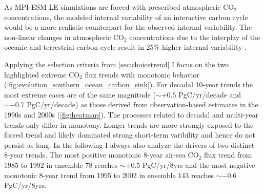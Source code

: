 As \acs{MPI-ESM LE} simulations are forced with prescribed atmospheric CO$_2$ concentrations, the modeled internal variability of an interactive carbon cycle would be a more realistic counterpart for the observed internal variability. The non-linear changes in atmospheric CO$_2$ concentrations due to the interplay of the oceanic and terrestrial carbon cycle result in 25\% higher internal variability \citep{Ilyina2013}.\newline





Applying the selection criteria from \autoref{sec:choicetrend} I focus on the two highlighted extreme CO$_2$ flux trends with monotonic behavior (\autoref{fig:evolution_southern_ocean_carbon_sink}). For decadal 10-year trends the most extreme cases are of the same magnitude ($\sim+0.5$ PgC/yr/decade and $\sim-0.7$ PgC/yr/decade) as those derived from observation-based estimates in the 1990s and 2000s \citep{landschuetzer2015} (\autoref{fig:heatmap}). The processes related to decadal and multi-year trends only differ in monotony. Longer trends are more strongly exposed to the forced trend and likely dominated strong short-term varibility and hence do not persist as long. In the following I always also analyze the drivers of two distinct 8-year trends. The most positive monotonic 8-year air-sea CO$_2$ flux trend from 1985 to 1992 in ensemble 78 reaches $\sim+0.5$ PgC/yr/8yrs and the most negative monotonic 8-year trend from 1995 to 2002 in ensemble 143 reaches $\sim-0.6$ PgC/yr/8yrs. 

